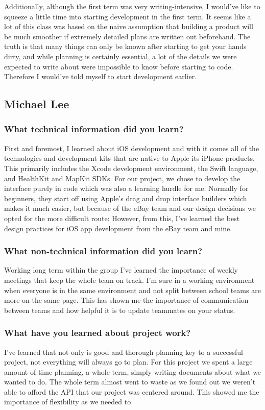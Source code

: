 Additionally, although the first term was very writing-intensive, I would've like to squeeze a little time into starting development in the first term. It seems like a lot of this class was based on the naive assumption that building a product will be much smoother if extremely detailed plans are written out beforehand. The truth is that many things can only be known after starting to get your hands dirty, and while planning is certainly essential, a lot of the details we were expected to write about were impossible to know before starting to code. Therefore I would've told myself to start development earlier.

\subsection{Michael Lee}

\subsubsection{What technical information did you learn?}
First and foremost, I learned about iOS development and with it comes all of the technologies and development kits that are native to Apple its iPhone products. This primarily includes the Xcode development environment, the Swift language, and HealthKit and MapKit SDKs. For our project, we chose to develop the interface purely in code which was also a learning hurdle for me. Normally for beginners, they start off using Apple’s drag and drop interface builders which makes it much easier, but because of the eBay team and our design decisions we opted for the more difficult route: However, from this, I’ve learned the best design practices for iOS app development from the eBay team and mine.

\subsubsection{What non-technical information did you learn?}
Working long term within the group I’ve learned the importance of weekly meetings that keep the whole team on track. I’m sure in a working environment when everyone is in the same environment and not split between school teams are more on the same page. This has shown me the importance of communication between teams and how helpful it is to update teammates on your status. 

\subsubsection{What have you learned about project work?}
I’ve learned that not only is good and thorough planning key to a successful project, not everything will always go to plan. For this project we spent a large amount of time planning, a whole term, simply writing documents about what we wanted to do. The whole term almost went to waste as we found out we weren’t able to afford the API that our project was centered around. This showed me the importance of flexibility as we needed to 

